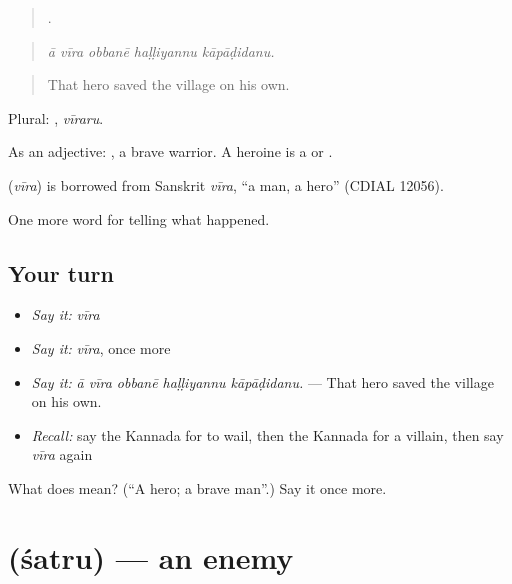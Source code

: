 \begin{quote}
    .
\end{quote}

\begin{quote}
\emph{ā vīra obbanē haḷḷiyannu kāpāḍidanu.}
\end{quote}

\begin{quote}
That hero saved the village on his own.
\end{quote}

Plural: , \emph{vīraru}.

As an adjective:  , a brave warrior. A heroine is a  or  .

\begin{cousinweb}
\textbf{} (\emph{vīra}) is borrowed from Sanskrit \emph{vīra}, \textquotedblleft{}a man, a hero\textquotedblright{} (CDIAL 12056).
\end{cousinweb}

\begin{grammarlens}[title={What you've built}]
One more word for telling what happened.
\end{grammarlens}

\subsection*{Your turn}
\begin{itemize}
\raggedright
  \item \emph{Say it:} \emph{vīra}
  \item \emph{Say it:} \emph{vīra}, once more
  \item \emph{Say it:} \emph{ā vīra obbanē haḷḷiyannu kāpāḍidanu.} — That hero saved the village on his own.
  \item \emph{Recall:} say the Kannada for to wail, then the Kannada for a villain, then say \emph{vīra} again
\end{itemize}

\begin{tcolorbox}[breakable,colback=teal!4,colframe=teal!35!black,title={Before you move on}]
What does  mean? (\textquotedblleft{}A hero; a brave man\textquotedblright{}.) Say it once more.
\end{tcolorbox}
\section[\texorpdfstring{\kn{ಶತ್ರು} (śatru)}{ಶತ್ರು (śatru)}]{ (śatru) — an enemy}

